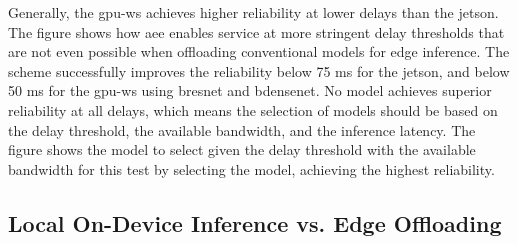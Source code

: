 Generally, the \gls{gpu-ws} achieves higher reliability at lower delays than the \gls{jetson}. The figure shows how \gls{aee} enables service at more stringent delay thresholds that are not even possible when offloading conventional models for edge inference. The scheme successfully improves the reliability below 75 ms for the \gls{jetson}, and below 50 ms for the \gls{gpu-ws} using \gls{bresnet} and \gls{bdensenet}. 
No model achieves superior reliability at all delays, which means the selection of models should be based on the delay threshold, the available bandwidth, and the inference latency. The figure shows the model to select given the delay threshold with the available bandwidth for this test by selecting the model, achieving the highest reliability.

\subsection{Local On-Device Inference vs. Edge Offloading}

